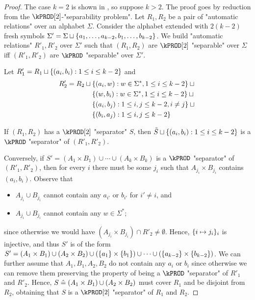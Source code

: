 \begin{proof}
    The case $k=2$ is shown in , so suppose $k>2$.
    The proof goes by reduction from the $\kPROD[2]$-"separability problem". Let $R_1,R_2$ be a pair of "automatic relations" over an alphabet $\Sigma$. Consider the alphabet extended with $2(k-2)$ fresh symbols $\Sigma' = \Sigma \sqcup \{a_1, \dotsc, a_{k-2}, b_1, \dotsc, b_{k-2}\}$. We build "automatic relations" $R'_1,R'_2$ over $\Sigma'$ such that $(R_1,R_2)$ are $\kPROD[2]$ "separable" over $\Sigma$ if{f} $(R'_1,R'_2)$ are $\kPROD$ "separable" over $\Sigma'$.

    Let $R'_1 = R_1 \sqcup \{ (a_i,b_i) : 1 \leq i \leq k-2\}$ and 
    \begin{align*}
    R'_2 =  R_2 \sqcup {}&\{(a_i,w) : w \in \Sigma^*, 1 \leq i \leq k-2\} \sqcup {}\\
                    &\{(w,b_i) : w \in \Sigma^*, 1 \leq i \leq k-2\} \sqcup {}\\
                    &\{(a_i,b_j) : 1 \leq i,j \leq k-2, i \neq j\} \sqcup {}\\
                    &\{(b_i,a_j) : 1 \leq i,j \leq k-2\}
    \end{align*}
    
    If $(R_1,R_2)$ has a $\kPROD[2]$ "separator" $S$, then $\tilde S \sqcup \{(a_i,b_i) : 1 \leq i \leq k-2\}$ is a $\kPROD$ "separator" of $(R'_1,R'_2)$.
    

    Conversely, if $S' = (A_1 \times B_1) \cup \dotsb \cup (A_k \times B_k)$ is a $\kPROD$ "separator" of $(R'_1,R'_2)$, then for every $i$ there must be some $j_i$ such that $A_{j_i} \times B_{j_i}$ contains $(a_i,b_i)$. Observe that 
    \begin{itemize}
        \item $A_{j_i} \cup B_{j_i}$ cannot contain any $a_{i'}$ or $b_{i'}$ for $i' \neq i$, and
        \item $A_{j_i} \cup B_{j_i}$ cannot contain any $w \in \Sigma^*$;
    \end{itemize}
    since otherwise we would have $(A_{j_i} \times B_{j_i}) \cap R'_2 \neq \emptyset$.
    Hence, $\{i \mapsto j_i\}_i$ is injective, and thus $S'$ is of the form $S' = (A_1 \times B_1) \cup (A_2 \times B_2)  \cup (\{a_1\} \times \{b_1\}) \cup \dotsb \cup (\{a_{k-2}\} \times \{b_{k-2}\})$. We can further assume that $A_1,B_1,A_2,B_2$ do not contain any $a_i$ or $b_i$ since otherwise we can remove them preserving the property of being a $\kPROD$ "separator" of $R'_1$ and $R'_2$.
    Hence, $S \mathrel{\hat{=}} (A_1 \times B_1) \cup (A_2 \times B_2)$ must cover $R_1$ and be disjoint from $R_2$, obtaining that $S$ is a $\kPROD[2]$ "separator" of $R_1$ and $R_2$.
\end{proof}

